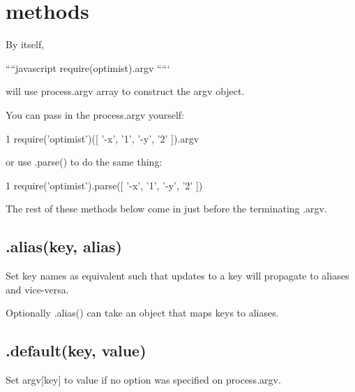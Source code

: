 

\section*{methods }

By itself,

````javascript require(\textquotesingle{}optimist\textquotesingle{}).argv `````

will use {\ttfamily process.\+argv} array to construct the {\ttfamily argv} object.

You can pass in the {\ttfamily process.\+argv} yourself\+:


\begin{DoxyCode}
1 require('optimist')([ '-x', '1', '-y', '2' ]).argv
\end{DoxyCode}


or use .parse() to do the same thing\+:


\begin{DoxyCode}
1 require('optimist').parse([ '-x', '1', '-y', '2' ])
\end{DoxyCode}


The rest of these methods below come in just before the terminating {\ttfamily .argv}.

\subsection*{.alias(key, alias) }

Set key names as equivalent such that updates to a key will propagate to aliases and vice-\/versa.

Optionally {\ttfamily .alias()} can take an object that maps keys to aliases.

\subsection*{.default(key, value) }

Set {\ttfamily argv\mbox{[}key\mbox{]}} to {\ttfamily value} if no option was specified on {\ttfamily process.\+argv}.

